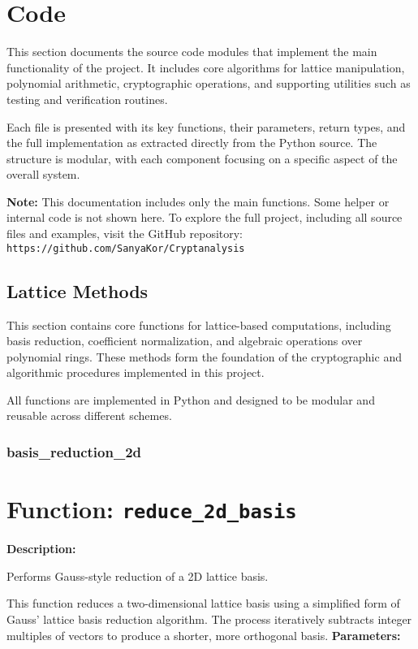 \documentclass[a4paper,12pt]{article}
\begin{document}

\section{Code}
This section documents the source code modules that implement the main functionality of the project.  
It includes core algorithms for lattice manipulation, polynomial arithmetic, cryptographic operations,  
and supporting utilities such as testing and verification routines.

Each file is presented with its key functions, their parameters, return types, and the full implementation  
as extracted directly from the Python source. The structure is modular, with each component focusing on  
a specific aspect of the overall system.

\vspace{1em}
\noindent
\textbf{Note:} This documentation includes only the main functions.  
Some helper or internal code is not shown here.  
To explore the full project, including all source files and examples, visit the GitHub repository:  
\texttt{https://github.com/SanyaKor/Cryptanalysis}

\subsection{Lattice Methods}
This section contains core functions for lattice-based computations, including basis reduction,  
coefficient normalization, and algebraic operations over polynomial rings.  
These methods form the foundation of the cryptographic and algorithmic procedures implemented in this project.

All functions are implemented in Python and designed to be modular and reusable across different schemes.
\subsubsection{basis\_reduction\_2d}

\section*{Function: \texttt{reduce\_2d\_basis}}

\textbf{Description:}

Performs Gauss-style reduction of a 2D lattice basis.

This function reduces a two-dimensional lattice basis using a simplified form
of Gauss' lattice basis reduction algorithm. The process iteratively subtracts
integer multiples of vectors to produce a shorter, more orthogonal basis.
\vspace{1em}
\noindent
\textbf{Parameters:}
\end{document}
